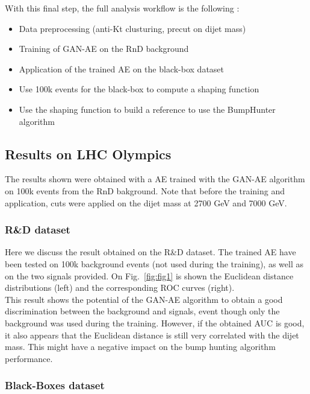 \documentclass[letterpaper,11pt]{article}
\begin{document}
\noindent With this final step, the full analysis workflow is the following :
\begin{itemize}
	\item Data preprocessing (anti-Kt clusturing, precut on dijet mass)
	\item Training of GAN-AE on the RnD background
	\item Application of the trained AE on the black-box dataset
	\item Use 100k events for the black-box to compute a shaping function
	\item Use the shaping function to build a reference to use the BumpHunter algorithm
\end{itemize}



\subsection{Results on LHC Olympics}
\label{sec:results}

\noindent The results shown were obtained with a AE trained with the GAN-AE algorithm on 100k events from the RnD bakground.
Note that before the training and application, cuts were applied on the dijet mass at 2700 GeV and 7000 GeV.


\subsubsection{R\&D dataset}
\label{sec:RnD}

\noindent Here we discuss the result obtained on the R\&D dataset.
The trained AE have been tested on 100k background events (not used during the training), as well as on the two signals provided.
On Fig.~\ref{fig:fig1} is shown the Euclidean distance distributions (left) and the corresponding ROC curves (right).\\

\noindent This result shows the potential of the GAN-AE algorithm to obtain a good discrimination between the background and signals, event though only the background was used during the training.
However, if the obtained AUC is good, it also appears that the Euclidean distance is still very correlated with the dijet mass.
This might have a negative impact on the bump hunting algorithm performance.

\subsubsection{Black-Boxes dataset}
\label{sec:BB}
\end{document}
